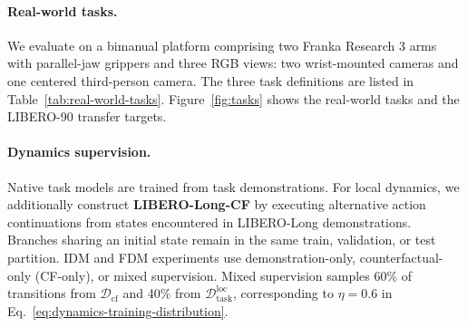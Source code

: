 \begin{table}[t]
    \centering
    \caption{Real-world bimanual manipulation tasks.}
    \label{tab:real-world-tasks}
    \small
\end{table}

\paragraph{Real-world tasks.}
We evaluate on a bimanual platform comprising two Franka Research 3 arms
with parallel-jaw grippers and three RGB views: two wrist-mounted cameras
and one centered third-person camera. The three task definitions
are listed in Table~\ref{tab:real-world-tasks}. Figure~\ref{fig:tasks} shows the
real-world tasks and the LIBERO-90 transfer targets.

\paragraph{Dynamics supervision.}
Native task models are trained from task demonstrations. For local dynamics,
we additionally construct \textbf{LIBERO-Long-CF} by executing alternative
action continuations from states encountered in LIBERO-Long demonstrations.
Branches sharing an initial state remain in the same train, validation, or
test partition.
IDM and FDM experiments use demonstration-only, counterfactual-only
(CF-only), or mixed supervision. Mixed supervision samples 60\% of
transitions from $\mathcal D_{\mathrm{cf}}$ and 40\% from
$\mathcal D_{\mathrm{task}}^{\mathrm{loc}}$, corresponding to $\eta=0.6$
in Eq.~\ref{eq:dynamics-training-distribution}.

